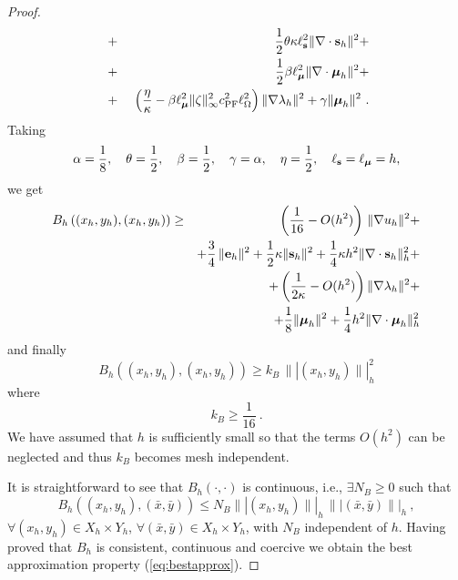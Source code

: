 \begin{proof}
\begin{eqnarray}
		~&+&~\frac12 \theta \kappa \ell_{\mathbf{s}}^2 \|\nabla \cdot \mathbf{s}_h\|^2 + \nonumber \\
		~&+&~\frac12 \beta \ell_{\boldsymbol{\mu}}^2 \| \nabla \cdot \boldsymbol{\mu}_h\|^2 + \nonumber \\
		~&+&~\left ( \frac{\eta}{\kappa}-\beta \ell_{\boldsymbol{\mu}}^2 \|\zeta\|_{\infty}^2 c_{\mbox{\scriptsize{PF}}}^2 \ell_{\Omega}^2 \right ) \|\nabla \lambda_h\|^2 + \gamma \|\boldsymbol{\mu}_h\|^2~. \label{eq:Bhparams}
	\end{eqnarray}
	Taking
	\begin{equation}
	\alpha = \frac{1}{8}, \quad \theta=\frac12,\quad \beta=\frac12,
	\quad \gamma=\alpha, \quad \eta = \frac12,
	\quad \ell_{\mathbf{s}} = \ell_{\boldsymbol{\mu}} = h, \label{eq:paramsopt}
	\end{equation}
	we get
	\begin{eqnarray*}
		B_h\left ( (x_h,y_h),(x_h,y_h) \right ) &\geq  &
		\left ( \frac{1}{16} - O(h^2) \right )\, \|\nabla u_h\|^2+\\
		& & +\frac{3}{4}\,\|\mathbf{e}_h\|^2+\frac12 \kappa \|\mathbf{s}_h\|^2 + \frac14 \kappa h^2 \|\nabla \cdot \mathbf{s}_h\|_h^2 + \\
		& &
		+\left (\frac{1}{2\kappa}  -O(h^2) \right ) \|\nabla \lambda_h\|^2 + \\
		& & + \frac18 \|\boldsymbol{\mu}_h\|^2  +\frac14 h^2 \|\nabla \cdot \boldsymbol{\mu}_h\|_h^2 
	\end{eqnarray*}
	and finally
	\begin{equation}
		B_h\left ( (x_h,y_h),({x}_h,{y}_h) \right ) \geq 
		k_B \, \| |(x_h,y_h)  \| |_h^2 
	\end{equation}
	where
	\begin{equation}
		k_B \geq \frac{1}{16}~.
	\end{equation}
	We have assumed that $h$ is sufficiently small so that the terms $O(h^2)$ can be neglected and thus $k_B$ becomes mesh independent. 
	
	It is straightforward to see that $B_h(\cdot,\cdot)$ is continuous, i.e., $\exists N_B\geq 0$ such that
	\begin{equation}
		B_h\left ( (x_h,y_h),(\bar{x},\bar{y}) \right ) \leq N_B \||(x_h,y_h)\||_h\,\||(\bar{x},\bar{y})\||_h~,
	\end{equation}
	$ \forall (x_h,y_h) \in X_h\times Y_h$, $\forall (\bar{x},\bar{y})\in X_h\times Y_h$, with $N_B$ independent of $h$. Having proved that $B_h$ is consistent, continuous and coercive we obtain the best approximation property (\ref{eq:bestapprox}).
\end{proof}


